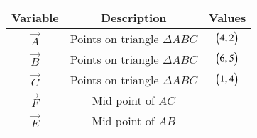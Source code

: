 \begin{tabular}[12pt]{ |c| c| c|}
    \hline
    \textbf{Variable} & \textbf{Description} & \textbf{Values} \\ 
    \hline
    $\vec{A}$ & Points on triangle $\Delta{ABC}$ & $\begin{pmatrix}4,2\end{pmatrix}$ \\
    \hline
    $\vec{B}$ & Points on triangle $\Delta{ABC}$ & $\begin{pmatrix}6,5\end{pmatrix}$ \\
    \hline
    $\vec{C}$ & Points on triangle $\Delta{ABC}$ & $\begin{pmatrix}1,4\end{pmatrix}$ \\
    \hline
    $\vec{F}$ &  Mid point of $AC$ & \\
    \hline 
    $\vec{E}$ &  Mid point of $AB$ & \\
    \hline   
    \end{tabular}
